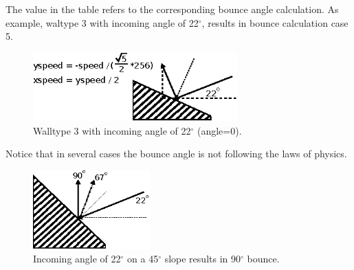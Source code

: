 \documentclass[book.tex]{subfiles}
\begin{document}
The value in the table refers to the corresponding bounce angle calculation. As example, waltype 3 with incoming angle of 22$^{\circ}$, results in bounce calculation case 5.

\par
\begin{figure}[H]
\centering
\includegraphics[width=0.7\textwidth]{imgs/drawings/bounce_angle.eps}
\caption{Walltype 3 with incoming angle of 22$^{\circ}$ (angle=0).}
\label{fig:bounce_angles}
\end{figure}
\par

\par
\begin{minipage}{\textwidth}
  
\end{minipage}
\label{wallclip_array}
\par

Notice that in several cases the bounce angle is not following the laws of physics.
\par
\begin{figure}[H]
\centering
\includegraphics[width=0.4\textwidth]{imgs/drawings/bounce_physics.eps}
\caption{Incoming angle of 22$^{\circ}$ on a 45$^{\circ}$ slope results in 90$^{\circ}$ bounce.}
\label{fig:bounce_angles}
\end{figure}
\par
\end{document}
